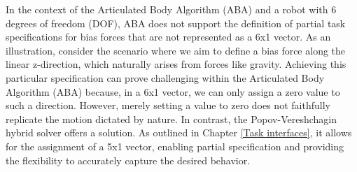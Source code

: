 \documentclass[report.tex]{subfiles}
\begin{document}
    In the context of the Articulated Body Algorithm (ABA) and a robot with 6 degrees of freedom (DOF), ABA does not support the definition of partial task specifications for bias forces that are not represented as a 6x1 vector. As an illustration, consider the scenario where we aim to define a bias force along the linear z-direction, which naturally arises from forces like gravity. Achieving this particular specification can prove challenging within the Articulated Body Algorithm (ABA) because, in a 6x1 vector, we can only assign a zero value to such a direction. However, merely setting a value to zero does not faithfully replicate the motion dictated by nature.
    In contrast, the Popov-Vereshchagin hybrid solver offers a solution. As outlined in Chapter \ref{Task interfaces}, it allows for the assignment of a 5x1 vector, enabling partial specification and providing the flexibility to accurately capture the desired behavior.
    \raggedbottom
\end{document}
